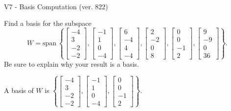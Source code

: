 \begin{exercise}
  \begin{exerciseTitle}V7 - Basis Computation (ver. 822)\end{exerciseTitle}
  \begin{exerciseStatement}
    Find a basis for the subspace 
\[W=\mathrm{span}\ \left\{\left[\begin{array}{r}
-4 \\
3 \\
-2 \\
-2
\end{array}\right] , \left[\begin{array}{r}
-1 \\
1 \\
0 \\
-4
\end{array}\right] , \left[\begin{array}{r}
6 \\
-4 \\
4 \\
-4
\end{array}\right] , \left[\begin{array}{r}
2 \\
-2 \\
0 \\
8
\end{array}\right] , \left[\begin{array}{r}
0 \\
0 \\
-1 \\
2
\end{array}\right] , \left[\begin{array}{r}
9 \\
-9 \\
0 \\
36
\end{array}\right]\right\}.\]
 Be sure to explain why your result is a basis.


  \end{exerciseStatement}
  \begin{exerciseAnswer}
   A basis of \(W\) is  \(\left\{\left[\begin{array}{r}
-4 \\
3 \\
-2 \\
-2
\end{array}\right] , \left[\begin{array}{r}
-1 \\
1 \\
0 \\
-4
\end{array}\right] , \left[\begin{array}{r}
0 \\
0 \\
-1 \\
2
\end{array}\right]\right\}\).
  


  \end{exerciseAnswer}
\end{exercise}